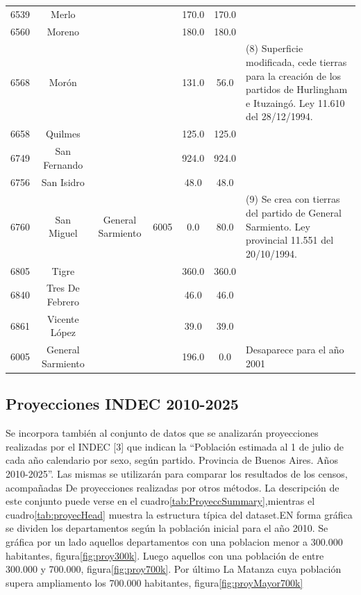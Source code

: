 \documentclass{article}
\theoremstyle{mytheoremstyle}
\theoremstyle{mytheoremstyle}
\theoremstyle{myproblemstyle}
\begin{document}
\begin{table}[htbp]
\begin{tabular}{|c|c|c|c|c|c|p{5cm}|}
        6539 & Merlo             && & 170.0             & 170.0 &   \\
        6560 & Moreno              &&& 180.0             & 180.0 & \\
        6568 & Morón                &&& 131.0             & 56.0  & (8) Superficie  modificada, cede tierras para la creación de los partidos de Hurlingham e Ituzaingó. Ley 11.610 del 28/12/1994.\\
        6658 & Quilmes            && & 125.0             & 125.0 &       \\
        6749 & San Fernando       && & 924.0             & 924.0 &    \\
        6756 & San Isidro         && & 48.0              & 48.0  &    \\
        6760 & San Miguel          & General Sarmiento & 6005  & 0.0 & 80.0 & (9) Se crea con tierras del partido de General Sarmiento. Ley provincial 11.551 del 20/10/1994. \\
        6805 & Tigre            &&   & 360.0             & 360.0 &     \\
        6840 & Tres De Febrero   &&  & 46.0              & 46.0  &      \\
        6861 & Vicente López     &&  & 39.0              & 39.0  &  \\
        6005 & General Sarmiento  && & 196.0             & 0.0   & Desaparece para el año 2001   \\        
     \hline
    \end{tabular}
    \label{tab:DimDepto}
\end{table}

\subsection{Proyecciones INDEC 2010-2025  }
Se incorpora también al conjunto de datos que se analizarán proyecciones realizadas por el INDEC [3] que indican la “Población estimada al 1 de julio de
 cada año calendario por sexo, según partido. Provincia de Buenos Aires. Años 2010-2025”. Las mismas se utilizarán para comparar los resultados de los censos, acompañadas De
 proyecciones realizadas por otros métodos.\newline
 La  descripción de este conjunto  puede verse en el  cuadro\ref{tab:ProyeccSummary},mientras el cuadro\ref{tab:proyecHead} muestra la estructura típica del 
 dataset.EN forma gráfica se dividen los departamentos según la población inicial para el año 2010. Se gráfica por un lado aquellos
 departamentos con una poblacion menor a 300.000 habitantes, figura\ref{fig:proy300k}. Luego aquellos con una población de entre 300.000 y 700.000,
  figura\ref{fig:proy700k}. Por último La Matanza cuya población supera ampliamento los 700.000 habitantes, figura\ref{fig:proyMayor700k}
\end{document}
